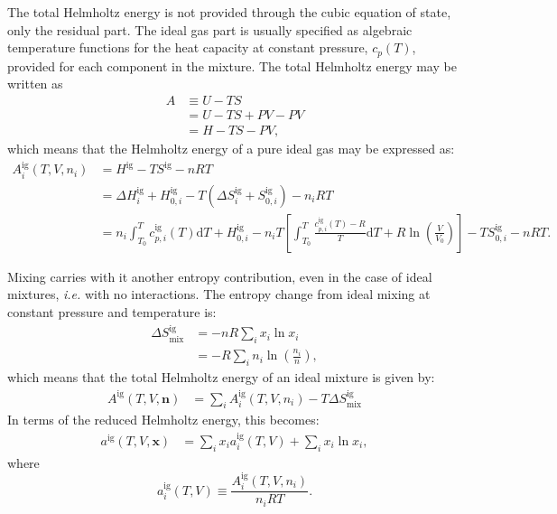 \documentclass[english]{../thermomemo/thermomemo}
\newcommand*{\vektor}[1]{\boldsymbol{#1}}%
\newcommand{\dd}[1]{\mathrm{d}{#1}}
\begin{document}
The total Helmholtz energy is not provided through the cubic equation of state, only the residual part.
The ideal gas part is usually specified as 
algebraic temperature functions for the heat capacity at constant pressure, $c_p(T)$, provided
for each component in the mixture. The total Helmholtz energy may be written as 
\begin{align}
  A &\equiv U - TS \nonumber\\
  &=U-TS+PV-PV \nonumber\\
  &= H - TS - PV,
  \label{}
\end{align}
which means that the Helmholtz energy of a pure ideal gas may be expressed as:
\begin{align}
  A^\text{ig}_i(T,V,n_i) &= H^\text{ig} - TS^\text{ig} - nRT
  \nonumber\\
  &= \Delta H_i^\text{ig} + H_{0,i}^\text{ig} 
  - T\left(  \Delta S_i^\text{ig} + S_{0,i}^\text{ig}  \right)  - n_i RT
  \nonumber\\
  &=  n_i \int_{T_0}^T c_{p,i}^\text{ig}(T) \dd{T} + H_{0,i}^\text{ig}
  -  n_i T \left[ \int_{T_0}^T \frac{c_{p,i}^\text{ig}(T) - R}{T} \dd{T} 
    + R \ln \left( \frac{V}{V_0} \right) \right]
     - T S_{0,i}^\text{ig} - nRT.
  \label{}
\end{align}

Mixing carries with it another entropy contribution, even in the case of ideal mixtures, \textit{i.e.} with no interactions. The entropy change 
from ideal mixing at constant pressure and temperature is:
\begin{align}
  \Delta S^\text{ig}_\text{mix} &= -nR \sum_i x_i \ln x_i 
  \nonumber\\
  &= -R \sum_i n_i \ln \left( \frac{n_i}{n} \right),
  \label{}
\end{align}
which means that the total Helmholtz energy of an ideal mixture is given by:
\begin{align}
  A^\text{ig}(T,V,\vektor{n}) &=  \sum_i A_i^\text{ig}(T,V,n_i) - T \Delta S^\text{ig}_\text{mix}
  \label{}
\end{align}
In terms of the reduced Helmholtz energy, this becomes:
\begin{align}
  a^\text{ig}(T,V,\vektor{x}) &=  \sum_i x_i a_i^\text{ig}(T,V) + \sum_i x_i \ln x_i, 
  \label{}
\end{align}
where 
\begin{equation}
  a_i^\text{ig}(T,V) \equiv \frac{A^\text{ig}_i(T,V,n_i)}{n_i RT}.
  \label{}
\end{equation}
\end{document}
